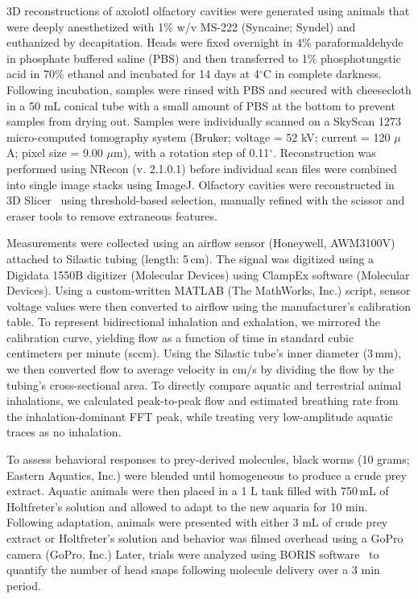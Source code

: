 \documentclass[%
 twocolumn,
 amsmath,amssymb,
 aps,prfluids,
 superscriptaddress,
]{revtex4-2}
\begin{document}
3D reconstructions of axolotl olfactory cavities were generated using animals that were deeply anesthetized with 1\% w/v MS-222 (Syncaine; Syndel) and euthanized by decapitation. Heads were fixed overnight in 4\% paraformaldehyde in phosphate buffered saline (PBS) and then transferred to 1\% phosphotungstic acid in 70\% ethanol and incubated for 14 days at 4$^\circ$C in complete darkness. Following incubation, samples were rinsed with PBS and secured with cheesecloth in a 50 mL conical tube with a small amount of PBS at the bottom to prevent samples from drying out. Samples were individually scanned on a SkyScan 1273 micro-computed tomography system (Bruker; voltage = 52 kV; current = 120 $\mu$A; pixel size = 9.00 $\mu$m), with a rotation step of 0.11$^\circ$. Reconstruction was performed using NRecon (v. 2.1.0.1) before individual scan files were combined into single image stacks using ImageJ. Olfactory cavities were reconstructed in 3D Slicer~\cite{fedorov20123d} using threshold-based selection, manually refined with the scissor and eraser tools to remove extraneous features.

Measurements were collected using an airflow sensor (Honeywell, AWM3100V) attached to Silastic tubing (length: 5\,cm). The signal was digitized using a Digidata 1550B digitizer (Molecular Devices) using ClampEx software (Molecular Devices). Using a custom-written MATLAB (The MathWorks, Inc.) script, sensor voltage values were then converted to airflow using the manufacturer's calibration table. To represent bidirectional inhalation and exhalation, we mirrored the calibration curve, yielding flow as a function of time in standard cubic centimeters per minute (sccm). Using the Silastic tube's inner diameter (3\,mm), we then converted flow to average velocity in cm/s by dividing the flow by the tubing’s cross-sectional area. To directly compare aquatic and terrestrial animal inhalations, we calculated peak-to-peak flow and estimated breathing rate from the inhalation-dominant FFT peak, while treating very low-amplitude aquatic traces as no inhalation. 

To assess behavioral responses to prey-derived molecules, black worms (10 grams; Eastern Aquatics, Inc.) were blended until homogeneous to produce a crude prey extract. Aquatic animals were then placed in a 1 L tank filled with 750\,mL of Holtfreter’s solution and allowed to adapt to the new aquaria for 10 min. Following adaptation, animals were presented with either 3 mL of crude prey extract or Holtfreter’s solution and behavior was filmed overhead using a GoPro camera (GoPro, Inc.) Later, trials were analyzed using BORIS software~\cite{friard2016boris} to quantify the number of head snaps following molecule delivery over a 3 min period.
\end{document}
